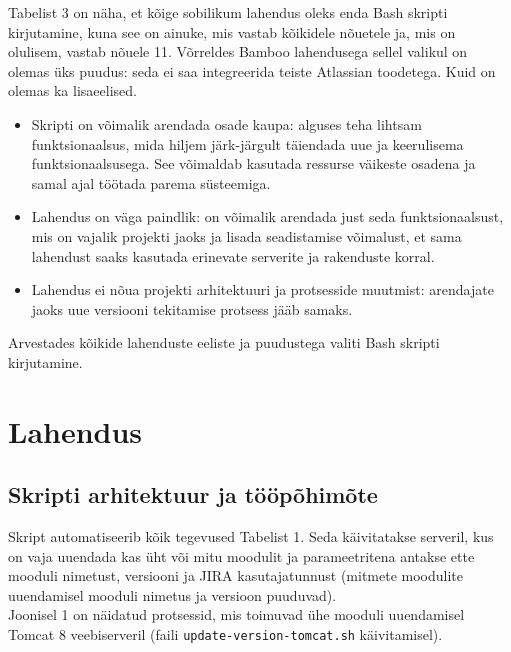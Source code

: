 \documentclass[12pt]{report}
\newcommand{\code}[1]{\texttt{#1}}
\begin{document}
  Tabelist 3 on näha, et kõige sobilikum lahendus oleks enda Bash skripti kirjutamine, kuna see on ainuke, mis vastab kõikidele nõuetele ja, mis on olulisem, vastab nõuele 11. Võrreldes Bamboo lahendusega sellel valikul on olemas üks puudus: seda ei saa integreerida teiste Atlassian toodetega. Kuid on olemas ka lisaeelised.
  \begin{itemize}
    \item Skripti on võimalik arendada osade kaupa: alguses teha lihtsam funktsionaalsus, mida hiljem järk-järgult täiendada uue ja keerulisema funktsionaalsusega. See võimaldab kasutada ressurse väikeste osadena ja samal ajal töötada parema süsteemiga.
    \item Lahendus on väga paindlik: on võimalik arendada just seda funktsionaalsust, mis on vajalik projekti jaoks ja lisada seadistamise võimalust, et sama lahendust saaks kasutada erinevate serverite ja rakenduste korral.
    \item Lahendus ei nõua projekti arhitektuuri ja protsesside muutmist: arendajate jaoks uue versiooni tekitamise protsess jääb samaks.
  \end{itemize}
  
  Arvestades kõikide lahenduste eeliste ja puudustega valiti Bash skripti kirjutamine.
  
  \newpage
  
  \section{Lahendus}
  
  \subsection{Skripti arhitektuur ja tööpõhimõte}
  
  Skript automatiseerib kõik tegevused Tabelist 1. Seda käivitatakse serveril, kus on vaja uuendada kas üht või mitu moodulit ja parameetritena antakse ette mooduli nimetust, versiooni ja JIRA kasutajatunnust (mitmete moodulite uuendamisel mooduli nimetus ja versioon puuduvad).\\
  
  Joonisel 1 on näidatud protsessid, mis toimuvad ühe mooduli uuendamisel Tomcat 8 veebiserveril (faili \code{update-version-tomcat.sh} käivitamisel).
   
\end{document}

